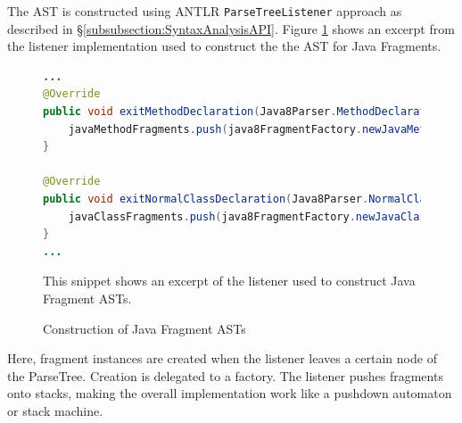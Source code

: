 The \gls{AST} is constructed using \gls{ANTLR} \texttt{ParseTreeListener} approach as described in §\ref{subsubsection:SyntaxAnalysisAPI}.
Figure \ref{figure:JavaFragmentASTConstruction} shows an excerpt from the listener implementation used to construct the the \gls{AST} for \gls{Java} \glspl{Fragment}.
\begin{figure}[h!]
\begin{lstlisting}[language=Java]
...
@Override
public void exitMethodDeclaration(Java8Parser.MethodDeclarationContext ctx) {
    javaMethodFragments.push(java8FragmentFactory.newJavaMethodFragment(ctx, javaMethodModifierFragments));
}

@Override
public void exitNormalClassDeclaration(Java8Parser.NormalClassDeclarationContext ctx) {
    javaClassFragments.push(java8FragmentFactory.newJavaClassFragment(ctx, javaClassModifierFragments, javaFieldFragments, javaMethodFragments, declaredPackage));
}
...
\end{lstlisting}
{
\scriptsize
This snippet shows an excerpt of the listener used to construct \gls{Java} \gls{Fragment} \glspl{AST}.
}
\caption{Construction of Java Fragment ASTs}
\label{figure:JavaFragmentASTConstruction}
\end{figure}
Here, fragment instances are created when the listener leaves a certain node of the \gls{ParseTree}.
Creation is delegated to a factory.
The listener pushes fragments onto stacks, making the overall implementation work like a pushdown automaton or stack machine.



